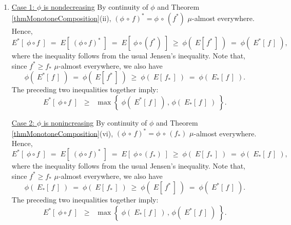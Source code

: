 \begin{enumerate}
\item
	\underline{Case 1: $\phi$ is nondecreasing}
	\vskip 0.0cm
	\noindent
	By continuity of $\phi$ and Theorem \ref{thmMonotoneComposition}(ii),
	$(\phi\,\circ\,f)^{*} = \phi\,\circ\,(f^{*})$ $\mu$-almost everywhere.
	Hence,
	\begin{equation*}
	E^{*}\!\left[\;\phi \circ f\;\right]
		\;=\; E\!\left[\;(\phi \circ f)^{*}\;\right]
		\;=\; E\!\left[\;\phi \circ (f^{*})\;\right]
		\;\geq\; \phi(\;E[\,f^{*}\,]\;)
		\;=\; \phi(\;E^{*}[\,f\,]\;),
	\end{equation*}
	where the inequality follows from the usual Jensen's inequality.
	Note that, since $f^{*} \geq f_{*}$ $\mu$-almost everywhere, we also have
	\begin{equation*}
	\phi(\;E^{*}[\,f\,]\;)
		\;=\; \phi(\;E[\,f^{*}\,]\;)
		\;\geq\; \phi(\;E[\,f_{*}\,]\;)
		\;=\; \phi(\;E_{*}[\,f\,]\;).
	\end{equation*}
	The preceding two inequalities together imply:
	\begin{equation*}
	E^{*}\!\left[\;\phi \circ f\;\right]
		\;\;\geq\;\; \max\!\left\{\;\phi(\;E^{*}[\,f\,]\;) \,,\, \phi(\;E_{*}[\,f\,]\;)\;\right\}.
	\end{equation*}

	\vskip 0.0cm
	\underline{Case 2: $\phi$ is nonincreasing}
	\vskip 0.0cm
	\noindent
	By continuity of $\phi$ and Theorem \ref{thmMonotoneComposition}(vi),
	$(\phi\,\circ\,f)^{*} = \phi\,\circ\,(f_{*})$ $\mu$-almost everywhere.
	Hence,
	\begin{equation*}
	E^{*}\!\left[\;\phi \circ f\;\right]
		\;=\; E\!\left[\;(\phi \circ f)^{*}\;\right]
		\;=\; E\!\left[\;\phi \circ (f_{*})\;\right]
		\;\geq\; \phi(\;E[\,f_{*}\,]\;)
		\;=\; \phi(\;E_{*}[\,f\,]\;),
	\end{equation*}
	where the inequality follows from the usual Jensen's inequality.
	Note that, since $f^{*} \geq f_{*}$ $\mu$-almost everywhere, we also have
	\begin{equation*}
	\phi(\;E_{*}[\,f\,]\;)
		\;=\; \phi(\;E[\,f_{*}\,]\;)
		\;\geq\; \phi(\;E[\,f^{*}\,]\;)
		\;=\; \phi(\;E^{*}[\,f\,]\;).
	\end{equation*}
	The preceding two inequalities together imply:
	\begin{equation*}
	E^{*}\!\left[\;\phi \circ f\;\right]
		\;\;\geq\;\; \max\!\left\{\;\phi(\;E_{*}[\,f\,]\;) \,,\, \phi(\;E^{*}[\,f\,]\;)\;\right\}.
	\end{equation*}


\end{enumerate}
